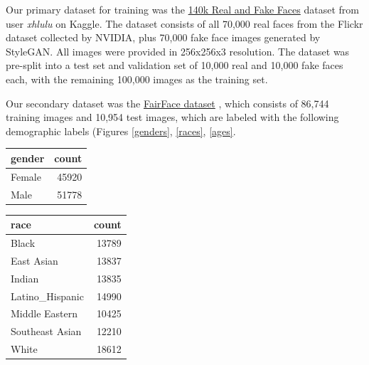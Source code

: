 \documentclass[11pt, letterpaper]{article}
\newenvironment{Figure}
  {\par\medskip\noindent\minipage{\linewidth}}
  {\endminipage\par\medskip}
\begin{document}
\begin{multicols}{2}
  Our primary dataset for training was the
  \href{https://www.kaggle.com/xhlulu/140k-real-and-fake-faces}{140k
    Real and Fake Faces} dataset from user \emph{xhlulu} on
  Kaggle. The dataset consists of all 70,000 real faces from the
  Flickr dataset collected by NVIDIA, plus 70,000 fake face images
  generated by StyleGAN. All images were provided in 256x256x3
  resolution. The dataset was pre-split into a test set and validation set
  of 10,000 real and 10,000 fake faces each, with the remaining 100,000
  images as the training set.

  Our secondary dataset was the
  \href{https://github.com/joojs/fairface}{FairFace dataset}
  \cite{karkkainen2019fairface}, which consists of 86,744 training
  images and 10,954 test images, which are labeled with the following
  demographic labels (Figures \ref{genders}, \ref{races}, \ref{ages}.

  \begin{Figure}
    \label{genders}
  \begin{tabular}{lr}
    \toprule
        gender &  count  \\
        \midrule
        Female &  45920 \\
        Male   &  51778 \\
        \bottomrule
  \end{tabular}
  \end{Figure}

  \begin{Figure}
    \label{races}
  \begin{tabular}{lr}
    \toprule
        race            &  count \\
        \midrule
        Black           &  13789 \\
        East Asian      &  13837 \\
        Indian          &  13835 \\
        Latino\_Hispanic &  14990 \\
        Middle Eastern  &  10425 \\
        Southeast Asian &  12210 \\
        White           &  18612 \\
        \bottomrule
  \end{tabular}
  \end{Figure}


\end{multicols}
\end{document}
